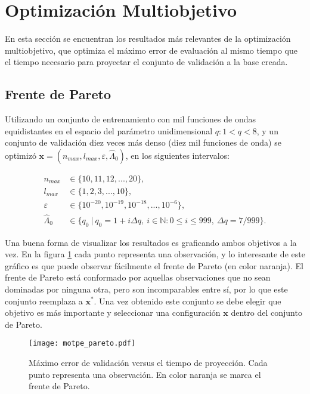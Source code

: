 \section{Optimización Multiobjetivo}

En esta sección se encuentran los resultados más relevantes de la optimización multiobjetivo, que optimiza el máximo error de evaluación al mismo tiempo que el tiempo necesario para proyectar el conjunto de validación a la base creada.

\subsection{Frente de Pareto}

Utilizando un conjunto de entrenamiento con mil funciones de ondas equidistantes en el espacio del parámetro unidimensional $q: 1 < q < 8$, y un conjunto de validación diez veces más denso (diez mil funciones de onda) se optimizó $\textbf{x} = (n_{max}, l_{max},\varepsilon, \hat{\Lambda}_0)$, en los siguientes intervalos:

\begin{align*}
n_{max} &\in \{10, 11, 12, ..., 20\},\\
l_{max} &\in \{1, 2, 3, ..., 10 \},\\
\varepsilon &\in \{  10^{-20}, 10^{-19}, 10^{-18}, ..., 10^{-6}\}, \\
\hat{\Lambda}_0 &\in \{q_0 \ | \ q_0 = 1 + i \Delta q, \ i\in \mathbb{N} : 0 \le i \le 999, \ \Delta q = 7/999 \}.
\end{align*}

Una buena forma de visualizar los resultados es graficando ambos objetivos a la vez. En la figura \ref{fig:pareto} cada punto representa una observación, y lo interesante de este gráfico es que puede observar fácilmente el frente de Pareto (en color naranja). El frente de Pareto está conformado por aquellas observaciones que no sean dominadas por ninguna otra, pero son incomparables entre sí, por lo que este conjunto reemplaza a $\textbf{x}^*$. Una vez obtenido este conjunto se debe elegir que objetivo es más importante y seleccionar una configuración $\textbf{x}$ dentro del conjunto de Pareto.

\begin{figure}[h!]
\centering
\texttt{[image: motpe\_pareto.pdf]}
\caption{Máximo error de validación versus el tiempo de proyección. Cada punto representa una observación. En color naranja se marca el frente de Pareto.}
\label{fig:pareto}
\end{figure}

